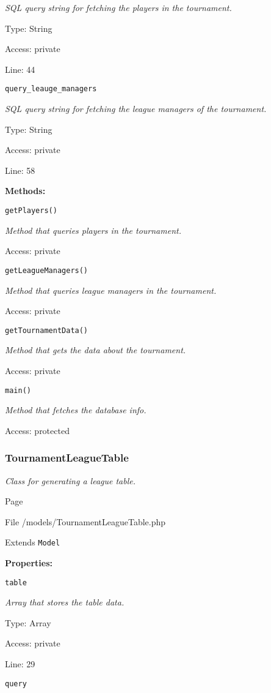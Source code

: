 {\scriptsize
\textit{SQL query string for fetching the players in the tournament.}

Type: String

Access: private

Line: 44

}
\texttt{query\_leauge\_managers}

{\scriptsize
\textit{SQL query string for fetching the league managers of the tournament.}

Type: String

Access: private

Line: 58

}
\textbf{Methods:}

\texttt{getPlayers()}

{\scriptsize
\textit{Method that queries players in the tournament.}

Access: private

}

\texttt{getLeagueManagers()}

{\scriptsize
\textit{Method that queries league managers in the tournament.}

Access: private

}

\texttt{getTournamentData()}

{\scriptsize
\textit{Method that gets the data about the tournament.}

Access: private

}

\texttt{main()}

{\scriptsize
\textit{Method that fetches the database info.}

Access: protected

}

\subsubsection{TournamentLeagueTable}
\textit{Class for generating a league table.}

Page \pageref{TournamentLeagueTable.php}

File /models/TournamentLeagueTable.php

Extends \texttt{Model}

\textbf{Properties:}

\texttt{table}

{\scriptsize
\textit{Array that stores the table data.}

Type: Array

Access: private

Line: 29

}
\texttt{query}

